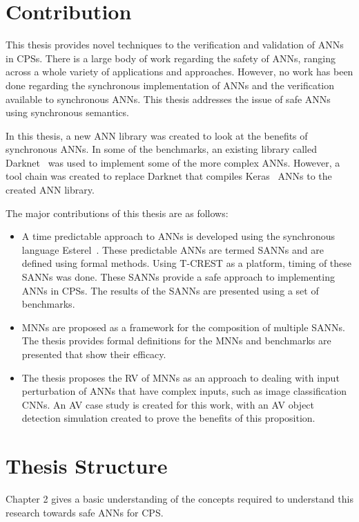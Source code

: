\section{Contribution}
This thesis provides novel techniques to the verification and validation of \acfp{ANN} in \acfp{CPS}.
There is a large body of work regarding the safety of \acp{ANN}, ranging across a whole variety of applications and approaches.
However, no work has been done regarding the synchronous implementation of \acp{ANN} and the verification available to synchronous \acp{ANN}.  
This thesis addresses the issue of safe \acp{ANN} using synchronous semantics.

In this thesis, a new \ac{ANN} library was created to look at the benefits of synchronous \acp{ANN}.
In some of the benchmarks, an existing library called Darknet~\cite{darknet13} was used to implement some of the more complex \acp{ANN}.
However, a tool chain was created to replace Darknet that compiles Keras~\cite{chollet2015keras} \acp{ANN} to the created \ac{ANN} library.

The major contributions of this thesis are as follows:
\begin{itemize}
	\item A time predictable approach to \acp{ANN} is developed using the synchronous language Esterel~\cite{berry2000foundations}. These predictable \acp{ANN} are termed \acfp{SANN} and are defined using formal methods. Using T-CREST as a platform, timing of these \acp{SANN} was done. These \acp{SANN} provide a safe approach to implementing \acp{ANN} in \acp{CPS}. The results of the \acp{SANN} are presented using a set of benchmarks. 
	\item \acfp{MNN} are proposed as a framework for the composition of multiple \acp{SANN}. The thesis provides formal definitions for the \acp{MNN} and benchmarks are presented that show their efficacy. 
	\item The thesis proposes the \acf{RV} of \acp{MNN} as an approach to dealing with input perturbation of \acp{ANN} that have complex inputs, such as image classification \acfp{CNN}. An \acf{AV} case study is created for this work, with an \ac{AV} object detection simulation created to prove the benefits of this proposition. 
\end{itemize}

\section{Thesis Structure}
Chapter 2 gives a basic understanding of the concepts required to understand this research towards safe \acp{ANN} for \ac{CPS}.

